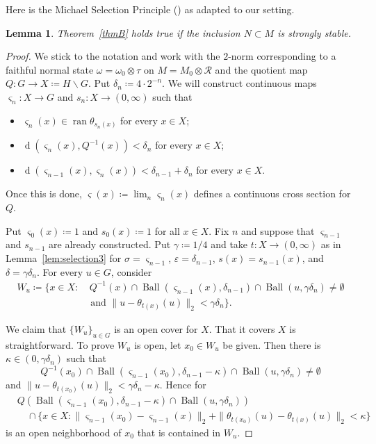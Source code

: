 \documentclass[12pt,nosumlimits,nonamelimits]{amsart}
\newtheorem{lem}[thm]{Lemma}
\theoremstyle{remark}
\newcommand{\cR}{\mathcal{R}}
\newcommand{\ve}{\varepsilon}
\newcommand{\vs}{\varsigma}
\DeclareMathOperator{\ran}{ran}
\DeclareMathOperator{\dist}{d}
\DeclareMathOperator{\Ball}{Ball}
\begin{document}
Here is the Michael Selection Principle (\cite{michael1}) as adapted to our setting. 
\begin{lem}\label{lem:pre}
Theorem~\ref{thmB} holds true if the inclusion $N\subset M$ 
is strongly stable.
\end{lem}
\begin{proof} 
We stick to the notation and 
work with the $2$-norm 
corresponding to a faithful normal state 
$\omega=\omega_0\otimes\tau$ on $M=M_0\otimes\cR$ 
and the quotient map $Q\colon G\to X\coloneqq H\backslash G$.  
Put $\delta_n\coloneqq 4\cdot 2^{-n}$. 
We will construct continuous maps $\vs_n\colon X\to G$ 
and $s_n\colon X\to(0,\infty)$ such that 
\begin{itemize}
\item
$\vs_n(x)\in\ran\theta_{s_n(x)}$ for every $x\in X$;
\item
$\dist(\vs_n(x),Q^{-1}(x)) < \delta_n$ for every $x\in X$;
\item
$\dist(\vs_{n-1}(x),\vs_{n}(x)) < \delta_{n-1}+\delta_n$ for every $x\in X$.
\end{itemize}
Once this is done, $\vs(x) \coloneqq \lim_n \vs_n(x)$ defines 
a continuous cross section for $Q$.

Put $\vs_0(x)\coloneqq 1$ and $s_0(x)\coloneqq 1$ for all $x\in X$. 
Fix $n$ and suppose that $\vs_{n-1}$ and $s_{n-1}$ are already constructed. 
Put $\gamma\coloneqq 1/4$ and take $t\colon X\to (0,\infty)$ 
as in Lemma~\ref{lem:selection3} for 
$\sigma=\vs_{n-1}$, $\ve=\delta_{n-1}$, $s(x)=s_{n-1}(x)$, and $\delta=\gamma\delta_n$. 
For every $u\in G$, consider 
\begin{align*}
W_u\coloneqq\{ x \in X : &\ Q^{-1}(x) \cap \Ball(\vs_{n-1}(x), \delta_{n-1}) 
 \cap \Ball(u, \gamma\delta_n) \neq\emptyset\\
 &\mbox{ and } \| u - \theta_{t(x)}(u)\|_2 < \gamma\delta_n\}.
\end{align*}

We claim that $\{W_u\}_{u \in G}$ is an open cover for $X$. 
That it covers $X$ is straightforward. 
To prove $W_u$ is open, let $x_0\in W_u$ be given. 
Then there is $\kappa\in(0,\gamma\delta_n)$ such that 
\[
Q^{-1}(x_0) \cap \Ball(\vs_{n-1}(x_0), \delta_{n-1}-\kappa) 
 \cap \Ball(u, \gamma\delta_n) \neq \emptyset
\]
and $\| u - \theta_{t(x_0)}(u)\|_2 < \gamma\delta_n-\kappa$. 
Hence for 
\begin{align*}
&Q(\Ball(\vs_{n-1}(x_0), \delta_{n-1}-\kappa)
 \cap \Ball(u, \gamma\delta_n))\\
 &\quad\cap \{ x\in X : 
  \|\vs_{n-1}(x_0)-\vs_{n-1}(x)\|_2 + \| \theta_{t(x_0)}(u) - \theta_{t(x)}(u)\|_2<\kappa\}
\end{align*}
is an open neighborhood of $x_0$ that is contained in $W_u$. 


\end{proof}
\end{document}
